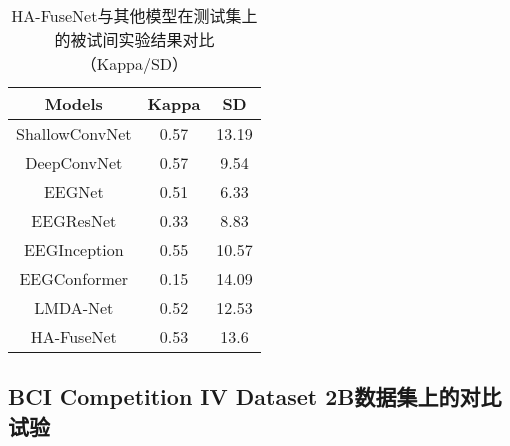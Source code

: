 \begin{table}[ht]
    \centering
    \caption{HA-FuseNet与其他模型在测试集上的被试间实验结果对比（Kappa/SD）}
    \label{tab:2acomparecrosssd}
    \begin{tabularx}{\textwidth}{CCC}
      \toprule
      Models & Kappa & SD \\
      \midrule
      ShallowConvNet\cite{schirrmeister2017deep} &0.57&13.19 \\
      DeepConvNet\cite{schirrmeister2017deep} &0.57&9.54\\
      EEGNet\cite{lawhern2018eegnet} &0.51& 6.33\\
      EEGResNet\cite{HBM:HBM23730} &0.33&8.83\\
      EEGInception\cite{zhang2021eeg} &0.55&10.57\\
      EEGConformer\cite{song2022eeg}&0.15&14.09 \\
      LMDA-Net\cite{miao2023lmda} &0.52&12.53\\
      \midrule 
      HA-FuseNet &0.53&13.6\\
      \bottomrule
    \end{tabularx}
\end{table}


\subsection{BCI Competition IV Dataset 2B数据集上的对比试验}

